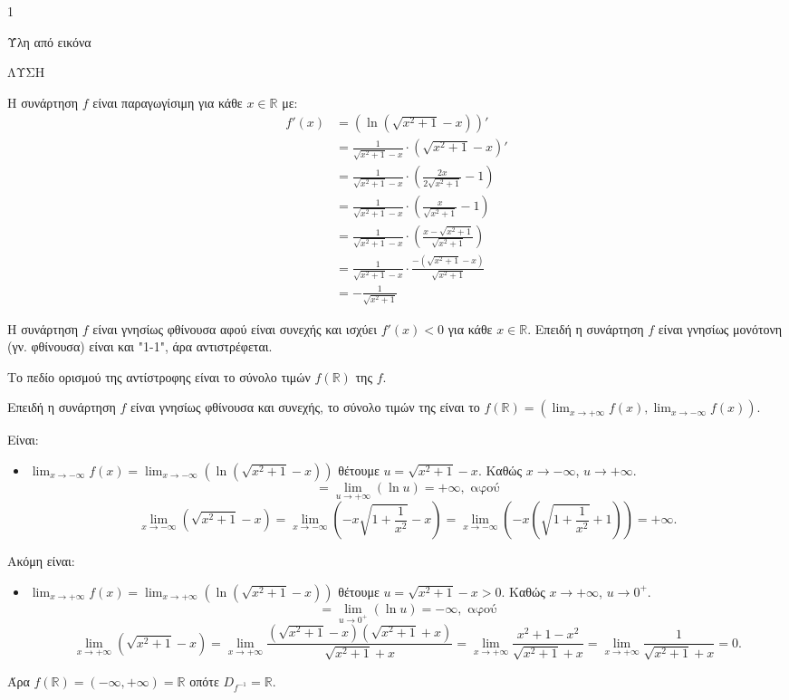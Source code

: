 \begin{ylh}{1}
    \item [Ύλη από εικόνα]
\end{ylh}
ΛΥΣΗ

\begin{alist}
\item Η συνάρτηση $f$ είναι παραγωγίσιμη για κάθε $x \in \mathbb{R}$ με:
\[
\begin{aligned}
f'(x) &= \left(\ln\left(\sqrt{x^2+1}-x\right)\right)' \\
&= \frac{1}{\sqrt{x^2+1}-x} \cdot \left(\sqrt{x^2+1}-x\right)' \\
&= \frac{1}{\sqrt{x^2+1}-x} \cdot \left(\frac{2x}{2\sqrt{x^2+1}}-1\right) \\
&= \frac{1}{\sqrt{x^2+1}-x} \cdot \left(\frac{x}{\sqrt{x^2+1}}-1\right) \\
&= \frac{1}{\sqrt{x^2+1}-x} \cdot \left(\frac{x-\sqrt{x^2+1}}{\sqrt{x^2+1}}\right) \\
&= \frac{1}{\sqrt{x^2+1}-x} \cdot \frac{-( \sqrt{x^2+1}-x)}{\sqrt{x^2+1}} \\
&= -\frac{1}{\sqrt{x^2+1}}
\end{aligned}
\]

\item Η συνάρτηση $f$ είναι γνησίως φθίνουσα αφού είναι συνεχής και ισχύει $f'(x)<0$ για κάθε $x \in \mathbb{R}$. Επειδή η συνάρτηση $f$ είναι γνησίως μονότονη (γν. φθίνουσα) είναι και "1-1", άρα αντιστρέφεται.

Το πεδίο ορισμού της αντίστροφης είναι το σύνολο τιμών $f(\mathbb{R})$ της $f$.

Επειδή η συνάρτηση $f$ είναι γνησίως φθίνουσα και συνεχής, το σύνολο τιμών της είναι το $f(\mathbb{R})=\left(\lim_{x\to+\infty} f(x), \lim_{x\to-\infty} f(x)\right)$.

Είναι:
\begin{itemize}
    \item $\lim_{x\to-\infty} f(x) = \lim_{x\to-\infty} \left(\ln\left(\sqrt{x^2+1}-x\right)\right)$
    \quad\quad θέτουμε $u=\sqrt{x^2+1}-x$. Καθώς $x \to -\infty$, $u \to +\infty$.
    \[
    = \lim_{u\to+\infty} (\ln u) = +\infty, \text{ αφού}
    \]
    \[
    \lim_{x\to-\infty} \left(\sqrt{x^2+1}-x\right) = \lim_{x\to-\infty} \left(-x\sqrt{1+\frac{1}{x^2}}-x\right) = \lim_{x\to-\infty} \left(-x\left(\sqrt{1+\frac{1}{x^2}}+1\right)\right) = +\infty.
    \]

\end{itemize}
Ακόμη είναι:
\begin{itemize}
    \item $\lim_{x\to+\infty} f(x) = \lim_{x\to+\infty} \left(\ln\left(\sqrt{x^2+1}-x\right)\right)$
    \quad\quad θέτουμε $u=\sqrt{x^2+1}-x > 0$. Καθώς $x \to +\infty$, $u \to 0^+$.
    \[
    = \lim_{u\to 0^+} (\ln u) = -\infty, \text{ αφού}
    \]
    \[
    \lim_{x\to+\infty} \left(\sqrt{x^2+1}-x\right) = \lim_{x\to+\infty} \frac{\left(\sqrt{x^2+1}-x\right)\left(\sqrt{x^2+1}+x\right)}{\sqrt{x^2+1}+x} = \lim_{x\to+\infty} \frac{x^2+1-x^2}{\sqrt{x^2+1}+x} = \lim_{x\to+\infty} \frac{1}{\sqrt{x^2+1}+x} = 0.
    \]
\end{itemize}
Άρα $f(\mathbb{R})=(-\infty,+\infty)=\mathbb{R}$ οπότε $D_{f^{-1}}=\mathbb{R}$.


\end{alist}

